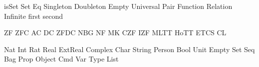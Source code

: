 \def\C#1{{\mathord{\mathsfmbf{#1}}}}
\def\Cto{\mathrel{\triangleright}}
\def\cI{{\C I}}
\def\cK{{\C K}}
\def\cM{{\C M}}
\def\cC{{\C C}}
\def\cS{{\C S}}
\def\cW{{\C W}}
\def\cB{{\C B}}
\def\cR{{\C R}}
\def\cV{{\C V}}
\def\cBp{{{\C B}'}}

\let\knuthsetminus=\setminus
\def\setminus{\mathbin{\knuthsetminus}}
\def\cantorcard#1{\overline{\overline{#1}}}
\def\cantorset{{\frak C}}
\def\continuum{\euf{c}}
\def\finord#1{\overline{#1}}
\def\eqc{\mathrel{=_{\namedop{c}}}}
\def\neqc{\mathrel{\not\eqc}}
\def\leqc{\mathrel{\leq_{\namedop{c}}}}
\def\geqc{\mathrel{\geq_{\namedop{c}}}}
\def\gtc{\mathrel{>_{\namedop{c}}}}
\def\ltc{\mathrel{<_{\namedop{c}}}}
\def\Univ{{\bbb V}}
\def\complement#1{\widetilde{#1}}
\let\compl=\complement
\def\russell#1{{\mathbf{r}(#1)}}
\def\metain{\mathrel{\in\kern-0.425em\in}}
\let\inclass=\metain
\def\classst#1#2{\pmbb{\{}\;{#1}\;\st \;{#2}\;\pmbb{\}}}
\def\classstt#1#2{\pmbb{\{}\;{#1}\;\st \;{\text{#2}}\;\pmbb{\}}}
\def\classimg#1#2{{#1}{\pmbb[}\,{#2}\,{\pmbb]}}
\let\clsimg=\classimg
\def\universet{{\cal U}}
\DefREL isSet Set
\DefRel Eq
\DefRel Singleton
\DefRel Doubleton
\DefRel Empty
\DefRel Universal
\DefRel Pair
\DefRel Function
\DefRel Relation
\DefRel Infinite
\DefFun first
\DefFun second
\def\kurpair#1#2{\set{\set{#1}, \set{{#1}, {#2}}}}
\def\disjunion{\mathbin{\uplus}}
\def\Disjunion{\mathop{\biguplus}}
\let\dunion=\disjunion
\let\Dunion=\Disjunion
\def\setsucc#1{{#1}{}^+}
\def\kleenestar#1{{#1}^\star}
\def\kleenestarp#1{\paren{#1}^\star}
\let\kstar=\kleenestar
\let\kstarp=\kleenestarp

\DefFou ZF
\DefFou ZFC
\DefFou AC
\DefFou DC
\DefFou ZFDC
\DefFou NBG
\DefFou NF
\DefFou MK
\DefFou CZF
\DefFou IZF
\DefFou MLTT
\DefFou HoTT
\DefFou ETCS
\DefFou CL
\def\ACN{\mathord{\AC}_\nats}

\DefType Nat
\DefType Int
\DefType Rat
\DefType Real
\DefType ExtReal
\DefType Complex
\DefType Char
\DefType String
\DefType Person
\DefType Bool
\DefType Unit
\DefType Empty
\DefType Set
\DefType Seq
\DefType Bag
\DefType Prop
\DefType Object
\DefType Cmd
\DefType Var
\DefType Type
\DefType List
\def\lnil{\mathord{[\,]}}%
\def\lcons{\mathbin{\doublecolon}}%
\def\list#1{\bracket{#1}}
\def\oftype{\mathrel{:}}
\let\is=\oftype
\let\hastype=\is
\def\namedrule#1{{\scshape #1}}
\def\rulelabel#1{{\smaller\scshape #1}}
\let\cons=\namedcons
\let\type=\namedtype
\let\fun=\namedfun
\let\var=\namedvar
\def\fsec#1#2{(\fA {\mathord{#1}} {\mathord{#2}})}%

